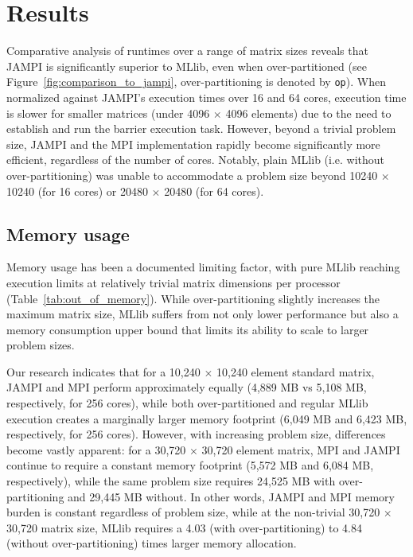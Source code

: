 \documentclass[fleqn,10pt]{SelfArx} %
\begin{document}

\section{Results} %
\label{sec:results}

Comparative analysis of runtimes over a range of matrix sizes reveals that JAMPI is significantly superior to MLlib, even when over-partitioned (see Figure~\ref{fig:comparison_to_jampi}, over-partitioning is denoted by \texttt{op}). When normalized against JAMPI's execution times over 16 and 64 cores, execution time is slower for smaller matrices (under 4096 $\times$ 4096 elements) due to the need to establish and run the barrier execution task. However, beyond a trivial problem size, JAMPI and the MPI implementation rapidly become significantly more efficient, regardless of the number of cores. Notably, plain MLlib (i.e. without over-partitioning) was unable to accommodate a problem size beyond 10240 $\times$ 10240 (for 16 cores) or 20480 $\times$ 20480 (for 64 cores).

\subsection{Memory usage} %
\label{sub:memory_usage}

Memory usage has been a documented limiting factor, with pure MLlib reaching execution limits at relatively trivial matrix dimensions per processor (Table~\ref{tab:out_of_memory}). While over-partitioning slightly increases the maximum matrix size, MLlib suffers from not only lower performance but also a memory consumption upper bound that limits its ability to scale to larger problem sizes.

Our research indicates that for a 10,240 $\times$ 10,240 element standard matrix, JAMPI and MPI perform approximately equally (4,889 MB vs 5,108 MB, respectively, for 256 cores), while both over-partitioned and regular MLlib execution creates a marginally larger memory footprint (6,049 MB and 6,423 MB, respectively, for 256 cores).  However, with increasing problem size, differences become vastly apparent: for a 30,720 $\times$ 30,720 element matrix, MPI and JAMPI continue to require a constant memory footprint (5,572 MB and 6,084 MB, respectively), while the same problem size requires 24,525 MB with over-partitioning and 29,445 MB without. In other words, JAMPI and MPI memory burden is constant regardless of problem size, while at the non-trivial 30,720 $\times$ 30,720 matrix size, MLlib requires a 4.03 (with over-partitioning) to 4.84 (without over-partitioning) times larger memory allocation.
\end{document}
